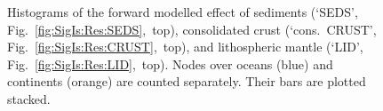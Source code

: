 \FloatBarrier

\begin{figure}
    \begin{adjustbox}{center}
    \end{adjustbox}
    \caption[Histograms of the SEDS, CRUST, LID corrections.]{
        Histograms of the forward modelled effect of sediments (`{SEDS}', Fig.~\ref{fig:SigIs:Res:SEDS},~top), consolidated crust (`{cons.~CRUST}', Fig.~\ref{fig:SigIs:Res:CRUST},~top), and lithospheric mantle (`{LID}', Fig.~\ref{fig:SigIs:Res:LID},~top).
        Nodes over oceans (blue) and continents (orange) are counted separately. Their bars are plotted stacked.
    }
    \label{fig:SigIs:Res:HistFwdCrust}
\end{figure}

